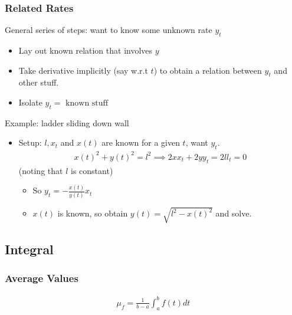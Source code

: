 \hypertarget{related-rates}{%
\subsubsection{Related Rates}\label{related-rates}}

General series of steps: want to know some unknown rate \(y_t\)

\begin{itemize}
\tightlist
\item
  Lay out known relation that involves \(y\)
\item
  Take derivative implicitly (say w.r.t \(t\)) to obtain a relation
  between \(y_t\) and other stuff.
\item
  Isolate \(y_t = \text{ known stuff }\)
\end{itemize}

\begin{example}[?]

Example: ladder sliding down wall

\begin{itemize}
\tightlist
\item
  Setup: \(l, x_t\) and \(x(t)\) are known for a given \(t\), want
  \(y_t\).
  \begin{align*}
  x(t)^2 + y(t)^2 = l^2 \implies 2xx_t +2yy_t = 2ll_t = 0
  \end{align*} (noting that \(l\) is constant)

  \begin{itemize}
  \tightlist
  \item
    So \(y_t = -\frac{x(t)}{y(t)}x_t\)
  \item
    \(x(t)\) is known, so obtain \(y(t) = \sqrt{l^2 - x(t)^2}\) and
    solve.
  \end{itemize}
\end{itemize}

\end{example}

\hypertarget{integral}{%
\subsection{Integral}\label{integral}}

\hypertarget{average-values}{%
\subsubsection{Average Values}\label{average-values}}

\begin{proposition}

\begin{align*}
\mu_f = \frac{1}{b-a}\int_a^b f(t) dt
\end{align*}

\end{proposition}

